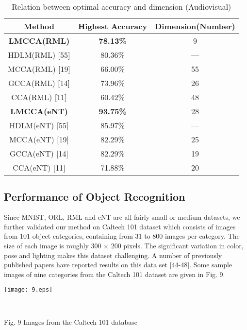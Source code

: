 \documentclass[journal]{IEEEtran}
\begin{document}
\begin{table}[h]
\small
\renewcommand{\arraystretch}{1.4}
\caption{\normalsize{Relation between optimal accuracy and dimension (Audiovisual)}}
\setlength{\abovecaptionskip}{0pt}
\setlength{\belowcaptionskip}{10pt}
\centering
\tabcolsep 0.07in
\begin{tabular}{ccc}
\hline
Method & Highest Accuracy & Dimension(Number)\\
\hline
\textbf{LMCCA(RML)} & \textbf{78.13\%} & 9\\
HDLM(RML) [55] &80.36\% &---\\
MCCA(RML) [19] &66.00\% & 55\\
GCCA(RML) [14] &73.96\% & 26\\
CCA(RML) [11] &60.42\% & 48\\
\textbf{LMCCA(eNT)} & \textbf{93.75\%} & 28\\
HDLM(eNT) [55] &85.97\% &---\\
MCCA(eNT) [19] &82.29\% & 25\\
GCCA(eNT) [14] &82.29\% & 19\\
CCA(eNT) [11] &71.88\% & 20\\
\hline
\end{tabular}
\end{table}
\subsection{Performance of Object Recognition}
Since MNIST, ORL, RML and eNT are all fairly small or medium datasets, we further validated our method on Caltech 101 dataset which consists of images from 101 object categories, containing from 31 to 800 images per category. The size of each image is roughly 300 $\times$ 200 pixels. The significant variation in color, pose and lighting makes this dataset challenging. A number of previously published papers have reported results on this data set [44-48]. Some sample images of nine categories from the Caltech 101 dataset are given in Fig. 9.
\centerline {\texttt{[image: 9.eps]}}\\ \centerline {Fig. 9 Images from the Caltech 101 database}\\\indent
\end{document}
